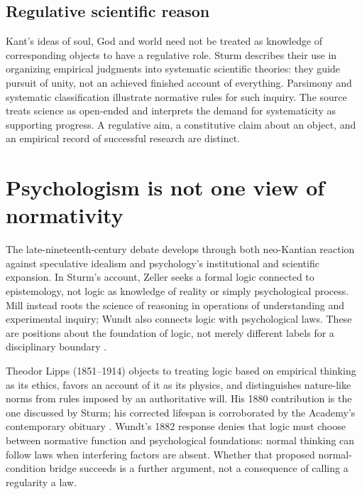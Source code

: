 \subsection{Regulative scientific reason}

Kant's ideas of soul, God and world need not be treated as knowledge
of corresponding objects to have a regulative role. Sturm describes
their use in organizing empirical judgments into systematic scientific
theories: they guide pursuit of unity, not an achieved finished account
of everything. Parsimony and systematic classification illustrate
normative rules for such inquiry. The source treats science as
open-ended and interprets the demand for systematicity as supporting
progress. A regulative aim, a constitutive claim about an object,
and an empirical record of successful research are distinct.

\section{Psychologism is not one view of normativity}
\label{sec:p13-r11-psychologism}

The late-nineteenth-century debate develops through both neo-Kantian
reaction against speculative idealism and psychology's institutional
and scientific expansion. In Sturm's account, Zeller seeks a formal
logic connected to epistemology, not logic as knowledge of reality
or simply psychological process. Mill instead roots the science of
reasoning in operations of understanding and experimental inquiry;
Wundt also connects logic with psychological laws. These are positions
about the foundation of logic, not merely different labels for a
disciplinary boundary \parencite[pp.~80--81]{Sturm2021DescriptiveNormativeHistory}.

Theodor Lipps (1851--1914) objects to treating logic based on empirical
thinking as its ethics, favors an account of it as its physics, and
distinguishes nature-like norms from rules imposed by an authoritative
will. His 1880 contribution is the one discussed by Sturm; his corrected
lifespan is corroborated by the Academy's contemporary obituary
\parencite[p.~81]{Sturm2021DescriptiveNormativeHistory}
\parencite[p.~69]{BAdW1915LippsObituary}.
Wundt's 1882 response denies that logic must choose between normative
function and psychological foundations: normal thinking can follow
laws when interfering factors are absent. Whether that proposed
normal-condition bridge succeeds is a further argument, not a
consequence of calling a regularity a law.

